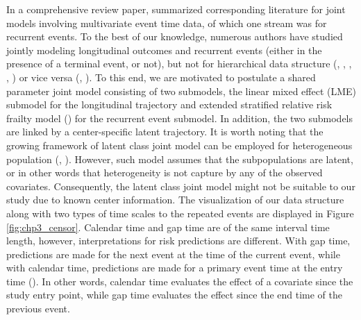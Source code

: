  In a comprehensive review paper, \cite{Hickey2018} summarized corresponding literature for joint models involving multivariate event time data, of which one stream was for recurrent events. To the best of our knowledge, numerous authors have studied jointly modeling longitudinal outcomes and recurrent events (either in the presence of a terminal event, or not), but not for hierarchical data structure (\cite{Liu2008}, \cite{Kim2012}, \cite{Musoro2015}, \cite{Shen2016}, \cite{Ren2021}) or vice versa (\cite{Luo2014}, \cite{Brilleman2019}). To this end, we are motivated to postulate a shared parameter joint model consisting of two submodels, the linear mixed effect (LME) submodel for the longitudinal trajectory and extended stratified relative risk frailty model (\cite{Rizopoulos2012b}) for the recurrent event submodel. In addition, the two submodels are linked by a center-specific latent trajectory. It is worth noting that the growing framework of latent class joint model can be employed for heterogeneous population (\cite{Han2007}, \cite{Brombin2016}). However, such model assumes that the subpopulations are latent, or in other words that heterogeneity is not capture by any of the observed covariates. Consequently, the latent class joint model might not be suitable to our study due to known center information. The visualization of our data structure along with two types of time scales to the repeated events are displayed in Figure \ref{fig:chp3_censor}. Calendar time and gap time are of the same interval time length, however, interpretations for risk predictions are different. With gap time, predictions are made for the next event at the time of the current event, while with calendar time, predictions are made for a primary event time at the entry time (\cite{Smedinga2017}). In other words, calendar time evaluates the effect of a covariate since the study entry point, while gap time evaluates the effect since the end time of the previous event. 
 

